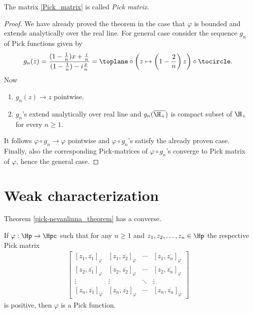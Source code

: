 The matrix \ref{Pick_matrix} is called \textit{Pick matrix}.

\begin{proof}
	We have already proved the theorem in the case that $\varphi$ is bounded and extends analytically over the real line. For general case consider the sequence $g_{n}$ of Pick functions given by
	\[
		g_{n}(z) = \frac{(1 - \frac{1}{n})x + \frac{i}{n}}{(1 - \frac{1}{n}) - i\frac{x}{n}} = \toplane \circ \left(z \mapsto \left(1 - \frac{2}{n}\right)z\right) \circ \tocircle.
	\]
	Now
	\begin{enumerate}
		\item $g_{n}(z) \to z$ pointwise.
		\item $g_{n}$'s extend analytically over real line and $g_{n}(\overline{\H_{+}})$ is compact subset of $\H_{+}$ for every $n \geq 1$.
	\end{enumerate}
	It follows $\varphi \circ g_{n} \to \varphi$ pointwise and $\varphi \circ g_{n}$'s satisfy the already proven case. Finally, also the corresponding Pick-matrices of $\varphi \circ g_{n}$'s converge to Pick matrix of $\varphi$, hence the general case.
\end{proof}

\section{Weak characterization}

Theorem \ref{pick-nevanlinna_theorem} has a converse.

\begin{lause}\label{pick-nevanlinna_converse}
	If $\varphi : \Hp \to \Hpc$ such that for any $n \geq 1$ and $z_{1}, z_{2}, \ldots, z_{n} \in \Hp$ the respective Pick matrix
	\begin{align*}
	\begin{bmatrix}
		[z_{1}, \overline{z_{1}}]_{\varphi} & [z_{1}, \overline{z_{2}}]_{\varphi} & \cdots & [z_{1}, \overline{z_{n}}]_{\varphi} \\
		[z_{2}, \overline{z_{1}}]_{\varphi} & [z_{2}, \overline{z_{2}}]_{\varphi} & \cdots & [z_{2}, \overline{z_{n}}]_{\varphi} \\
		\vdots & \vdots & \ddots & \vdots \\
		[z_{n}, \overline{z_{1}}]_{\varphi} & [z_{n}, \overline{z_{2}}]_{\varphi} & \cdots &  [z_{n}, \overline{z_{n}}]_{\varphi}
	\end{bmatrix}
	\end{align*}
	is positive, then $\varphi$ is a Pick function.
\end{lause}

